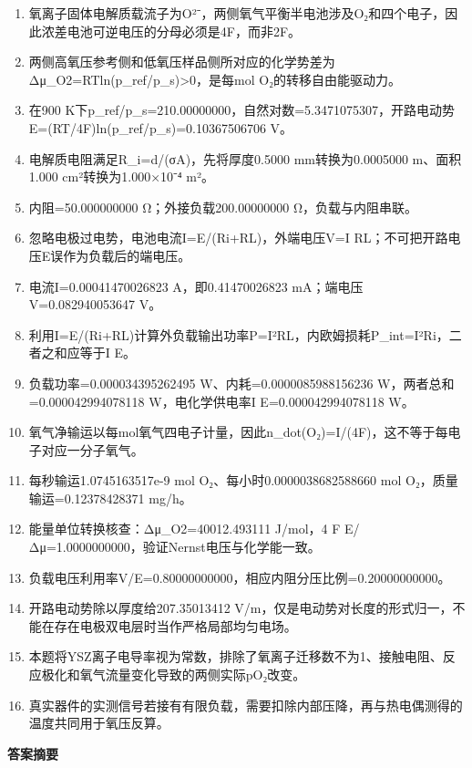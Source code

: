 \documentclass[UTF8,11pt,a4paper]{ctexart}
\begin{document}
\begin{enumerate}
\item 氧离子固体电解质载流子为O²⁻，两侧氧气平衡半电池涉及O₂和四个电子，因此浓差电池可逆电压的分母必须是4F，而非2F。
\item 两侧高氧压参考侧和低氧压样品侧所对应的化学势差为Δμ\_O2=RTln(p\_ref/p\_s)>0，是每mol O₂的转移自由能驱动力。
\item 在900 K下p\_ref/p\_s=210.00000000，自然对数=5.3471075307，开路电动势E=(RT/4F)ln(p\_ref/p\_s)=0.10367506706 V。
\item 电解质电阻满足R\_i=d/(σA)，先将厚度0.5000 mm转换为0.0005000 m、面积1.000 cm²转换为1.000×10⁻⁴ m²。
\item 内阻=50.000000000 Ω；外接负载200.00000000 Ω，负载与内阻串联。
\item 忽略电极过电势，电池电流I=E/(Ri+RL)，外端电压V=I RL；不可把开路电压E误作为负载后的端电压。
\item 电流I=0.00041470026823 A，即0.41470026823 mA；端电压V=0.082940053647 V。
\item 利用I=E/(Ri+RL)计算外负载输出功率P=I²RL，内欧姆损耗P\_int=I²Ri，二者之和应等于I E。
\item 负载功率=0.000034395262495 W、内耗=0.0000085988156236 W，两者总和=0.000042994078118 W，电化学供电率I E=0.000042994078118 W。
\item 氧气净输运以每mol氧气四电子计量，因此n\_dot(O₂)=I/(4F)，这不等于每电子对应一分子氧气。
\item 每秒输运1.0745163517e-9 mol O₂、每小时0.0000038682588660 mol O₂，质量输运=0.12378428371 mg/h。
\item 能量单位转换核查：Δμ\_O2=40012.493111 J/mol，4 F E/Δμ=1.0000000000，验证Nernst电压与化学能一致。
\item 负载电压利用率V/E=0.80000000000，相应内阻分压比例=0.20000000000。
\item 开路电动势除以厚度给207.35013412 V/m，仅是电动势对长度的形式归一，不能在存在电极双电层时当作严格局部均匀电场。
\item 本题将YSZ离子电导率视为常数，排除了氧离子迁移数不为1、接触电阻、反应极化和氧气流量变化导致的两侧实际pO₂改变。
\item 真实器件的实测信号若接有有限负载，需要扣除内部压降，再与热电偶测得的温度共同用于氧压反算。
\end{enumerate}
\noindent\textbf{答案摘要}\par
\end{document}
